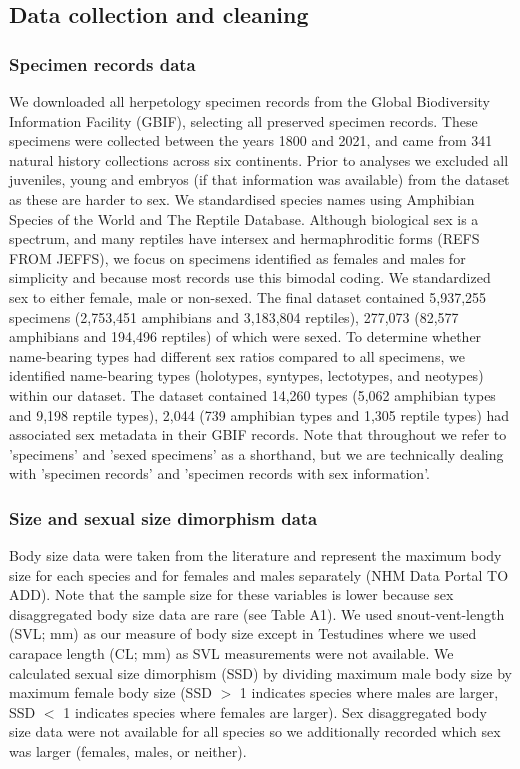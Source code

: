 \documentclass[a4paper, 12pt]{article}
\begin{document}
\subsection{Data collection and cleaning}

\subsubsection{Specimen records data}
We downloaded all herpetology specimen records from the Global Biodiversity Information Facility (GBIF\cite{gbif-amphibians,gbif-reptiles}), selecting all preserved specimen records. 
These specimens were collected between the years 1800 and 2021, and came from 341 natural history collections across six continents. 
Prior to analyses we excluded all juveniles, young and embryos (if that information was available) from the dataset as these are harder to sex. 
We standardised species names using Amphibian Species of the World\cite{frost2021} and The Reptile Database\cite{uetz2021}. 
Although biological sex is a spectrum\cite{sciam2017}, and many reptiles have intersex and hermaphroditic forms (REFS FROM JEFFS), we focus on specimens identified as females and males for simplicity and because most records use this bimodal coding. 
We standardized sex to either female, male or non-sexed. 
The final dataset contained 5,937,255 specimens (2,753,451 amphibians and 3,183,804 reptiles), 277,073 (82,577 amphibians and 194,496 reptiles) of which were sexed. 
To determine whether name-bearing types had different sex ratios compared to all specimens, we identified name-bearing types (holotypes, syntypes, lectotypes, and neotypes\cite{schuchert1897type}) within our dataset.
The dataset contained 14,260 types (5,062 amphibian types and 9,198 reptile types), 2,044 (739 amphibian types and 1,305 reptile types) had associated sex metadata in their GBIF records.
Note that throughout we refer to 'specimens' and 'sexed specimens' as a shorthand, but we are technically dealing with 'specimen records' and 'specimen records with sex information'. 

\subsubsection{Size and sexual size dimorphism data}
Body size data were taken from the literature and represent the maximum body size for each species and for females and males separately (NHM Data Portal TO ADD). 
Note that the sample size for these variables is lower because sex disaggregated body size data are rare (see Table A1).
We used snout-vent-length (SVL; mm) as our measure of body size except in Testudines where we used carapace length (CL; mm) as SVL measurements were not available.
We calculated sexual size dimorphism (SSD) by dividing maximum male body size by maximum female body size (SSD $>$ 1 indicates species where males are larger, SSD $<$ 1 indicates species where females are larger). 
Sex disaggregated body size data were not available for all species so we additionally recorded which sex was larger (females, males, or neither). 
 
\end{document}

